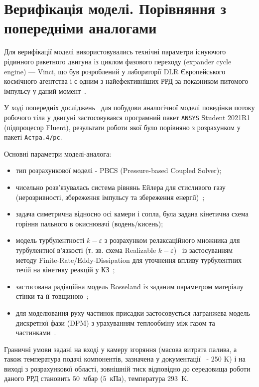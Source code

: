 \section{Верифікація моделі. Порівняння з попередніми аналогами}

Для верифікації моделі використовувались технічні параметри існуючого рідинного ракетного двигуна із циклом фазового переходу (expander cycle engine) --- Vinci, що був розроблений у лабораторії DLR Європейського космічного агентства і є одним з найефективніших РРД за показником питомого імпульсу у даний момент~\cite{VinciData}.

У ході попередніх досліджень~\cite{Previous} для побудови аналогічної моделі поведінки потоку робочого тіла у двигуні застосовувався програмний пакет \texttt{ANSYS} Student 2021R1 (підпроцесор Fluent), результати роботи якої було порівняно з розрахунком у пакеті \texttt{Астра.4/рс}.

Основні параметри моделі-аналога:

\begin{itemize}
	\item тип розрахункової моделі - PBСS (Pressure-based Coupled Solver);
	\item чисельно розв'язувалась система рівнянь Ейлера для стисливого газу (нерозривності, збереження імпульсу та збереження енергії)~\cite{GuidePBCS};
	\item задача симетрична відносно осі камери і сопла, була задана кінетична схема горіння пального в окиснювачі (водень/кисень);
	\item модель турбулентності $k-\varepsilon$ з розрахунком релаксаційного множника для турбулентної в'язкості (т. зв. схема Realizable $k-\varepsilon$)~\cite{GuideKEpsilon} із застосуванням методу Finite-Rate/Eddy-Dissipation для уточнення впливу турбулентних течій на кінетику реакцій у КЗ~\cite{GuideChemistry};
	\item застосована радіаційна модель Rosseland із заданим параметром матеріалу стінки та її товщиною~\cite{GuideRosseland};
	\item для моделювання руху частинок присадки застосовується лагранжева модель дискретної фази (DPM) з урахуванням теплообміну між газом та частинками~\cite{GuideDPM}.
\end{itemize}

Граничні умови задані на вході у камеру згоряння (масова витрата палива, а також температура подачі компонентів, зазначена у документації~\cite{VinciDataDLR} - 250 K) і на виході з розрахункової області, зовнішній тиск відповідно до середовища роботи даного РРД становить $50$~мбар ($5$~кПа), температура 293~K.

